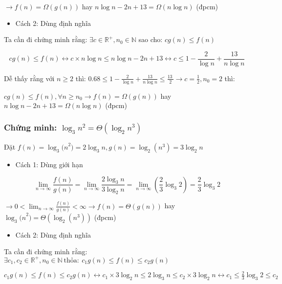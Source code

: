 \(\rightarrow f(n) = \Omega(g(n))\) hay
\(n\log n - 2n + 13 = \Omega(n\log n)\) (đpcm)

\begin{itemize}
\item
  Cách 2: Dùng định nghĩa
\end{itemize}

Ta cần đi chứng minh rằng: \(\exists c \in \mathbb{R}^{+},n_{0} \in \mathbb{N}\) sao cho:
\(cg(n) \leq f(n)\)

\[cg(n) \leq f(n) \leftrightarrow c\times n\log n \leq n\log n - 2n + 13 \leftrightarrow c \leq 1 - \frac{2}{\log n} + \frac{13}{n\log n}\]

Dễ thấy rằng với \(n \geq 2\) thì:
\(0.68 \leq 1 - \frac{2}{\log n} + \frac{13}{n\log n} \leq \frac{13\ }{2} \rightarrow c = \frac{1}{2},n_{0} = 2\)
thì:

\(cg(n) \leq f(n),\forall n \geq n_{0} \rightarrow f(n) = \Omega\left( g(n) \right)\)
hay \(n\log n - 2n + 13 = \Omega(n\log n)\) (đpcm)

\subsubsection{ \textbf{Chứng minh:}
  \(\log_3 n^2 = \Theta\left(\log_2 n^3\right)\)}

Đặt
\(f(n) = \log_{3}{{(n}^{2}) = 2\log_{3}n},g(n) = \log_{2}{(n^{3}) = 3\log_{2}n}\)

\begin{itemize}
\item
  Cách 1: Dùng giới hạn
\end{itemize}

\[\lim_{n \rightarrow \infty}\frac{f(n)}{g(n)} = \lim_{n \rightarrow \infty}\frac{2\log_{3}n}{3\log_{2}n} = \lim_{n \rightarrow \infty}\left(\frac{2}{3}\log_{3}{2}\right) = \frac{2}{3}\log_{3}2\]

\(\rightarrow 0 < \lim_{n \rightarrow \infty}\frac{f(n)}{g(n)} < \infty \rightarrow f(n) = \Theta(g(n))\)
hay \(\log_{3}{{(n}^{2})} = \Theta(\log_{2}{(n^{3})})\) (đpcm)

\begin{itemize}
\item
  Cách 2: Dùng định nghĩa
\end{itemize}

Ta cần đi chứng minh rằng:
\(\exists c_{1},c_{2} \in \mathbb{R}^{+},n_{0} \in \mathbb{N}\ \text{thỏa}:\ c_{1}g(n) \leq f(n) \leq c_{2}g(n)\)

\(c_{1}g(n) \leq f(n) \leq c_{2}g(n) \leftrightarrow c_{1}\times 3\log_{2}n \leq 2\log_{3}n \leq c_{2}\times 3\log_{2}n \leftrightarrow c_{1} \leq \frac{2}{3}\log_{3}2 \leq c_{2}\)

